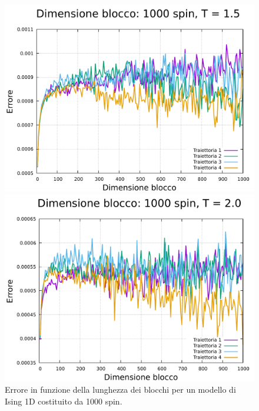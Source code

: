 \begin{figure}[htbp]
    \begin{minipage}{0.45\textwidth}  
      \centering
      \includegraphics[page=1, width=\textwidth]{Immagini/simIsing1D/magn0.02/lblk/err_1000_1.5.pdf}
      \caption{$T\,=\,1.5$}
    \end{minipage}\hfill
    \begin{minipage}{0.45\textwidth}  
      \centering
      \includegraphics[page=1, width=\textwidth]{Immagini/simIsing1D/magn0.02/lblk/err_1000_2.0.pdf}
      \caption{$T\,=\,2.0$}
    \end{minipage}
    \caption{Errore in funzione della lunghezza dei blocchi per un modello di Ising 1D costituito da 1000 spin.}
\end{figure}

